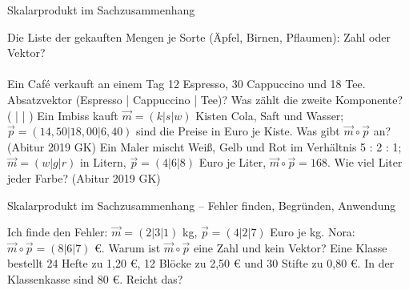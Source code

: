 \setcounter{aufgabe}{13}

\begin{aufgabe}{Skalarprodukt im Sachzusammenhang}
\begin{teile}
\teil Die Liste der gekauften Mengen je Sorte (Äpfel, Birnen, Pflaumen): Zahl oder Vektor? \\  \\ 
\teil Ein Café verkauft an einem Tag 12 Espresso, 30 Cappuccino und 18 Tee. Absatzvektor (Espresso | Cappuccino | Tee)? Was zählt die zweite Komponente? ( \leerfeld | \leerfeld | \leerfeld )
\teil Ein Imbiss kauft $\vec m = (k | s | w)$ Kisten Cola, Saft und Wasser; $\vec p = (14{,}50 | 18{,}00 | 6{,}40)$ sind die Preise in Euro je Kiste. Was gibt $\vec m \circ \vec p$ an? \hfill (Abitur 2019 GK)
\teil Ein Maler mischt Weiß, Gelb und Rot im Verhältnis 5 : 2 : 1; $\vec m = (w | g | r)$ in Litern, $\vec p = (4 | 6 | 8)$ Euro je Liter, $\vec m \circ \vec p = 168$. Wie viel Liter jeder Farbe? \hfill (Abitur 2019 GK)
\end{teile}
\end{aufgabe}

\begin{aufgabe}{Skalarprodukt im Sachzusammenhang – Fehler finden, Begründen, Anwendung}
\begin{teile}
\teil Ich finde den Fehler: $\vec m = (2 | 3 | 1)$ kg, $\vec p = (4 | 2 | 7)$ Euro je kg. Nora: $\vec m \circ \vec p = (8 | 6 | 7)$ €.
\teil Warum ist $\vec m \circ \vec p$ eine Zahl und kein Vektor?
\teil Eine Klasse bestellt 24 Hefte zu 1,20 €, 12 Blöcke zu 2,50 € und 30 Stifte zu 0,80 €. In der Klassenkasse sind 80 €. Reicht das?
\end{teile}
\end{aufgabe}
